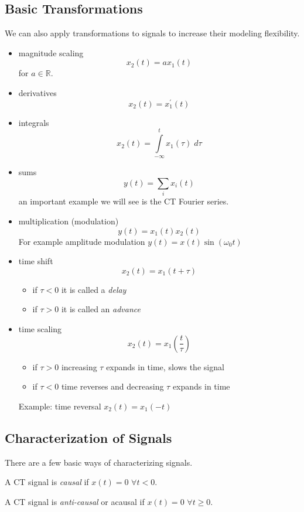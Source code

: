 \subsection{Basic Transformations}

We can also apply transformations to signals to increase their modeling flexibility.
  
\begin{itemize}
\item  magnitude scaling
  \[
  x_2(t) = a x_1(t)
  \]
  for $a \in \mathbb{R}$.
\item derivatives
  \[
  x_2(t) = x_1^\prime(t)
  \]
\item integrals
  \[
  x_2(t) = \int\limits_{-\infty}^t x_1(\tau) \; d\tau
  \]
\item sums
  \[
  y(t) = \sum\limits_{i} x_i(t)
  \]
  an important example we will see is the CT Fourier series.  
\item multiplication (modulation)
  \[
  y(t) = x_1(t) x_2(t)
  \]
  For example amplitude modulation $y(t) = x(t)\sin(\omega_0 t)$
\item time shift
  \[
  x_2(t) = x_1(t+\tau)
  \]
  \begin{itemize}
  \item if $\tau <0$ it is called a {\it delay}
  \item if $\tau >0$ it is called an {\it advance}
  \end{itemize}
  \item time scaling
    \[
    x_2(t) = x_1\left(\frac{t}{\tau}\right)
    \]
    \begin{itemize}
    \item if $\tau >0$ increasing $\tau$ expands in time, slows the signal
    \item if $\tau <0$ time reverses and decreasing $\tau$ expands in time
    \end{itemize}
    Example: time reversal $ x_2(t) = x_1(-t)$
\end{itemize}

\subsection{Characterization of Signals}

There are a few basic ways of characterizing signals.

\begin{definition}
  A CT signal is \emph{causal} if $x(t) = 0$ $\forall t < 0$.
\end{definition}
\begin{definition}
  A CT signal is \emph{anti-causal} or acausal if $x(t) = 0$ $\forall t \geq 0$.
\end{definition}

